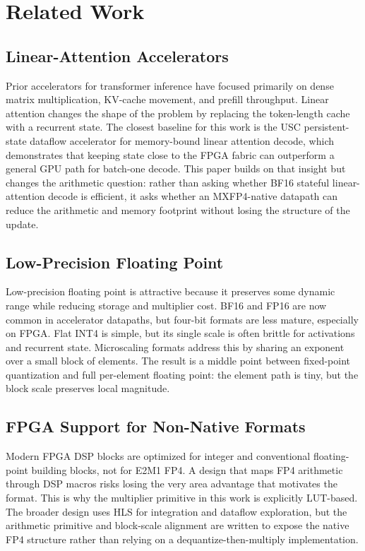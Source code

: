 \documentclass[conference]{IEEEtran}
\begin{document}
\section{Related Work}

\subsection{Linear-Attention Accelerators}

Prior accelerators for transformer inference have focused primarily on dense
matrix multiplication, KV-cache movement, and prefill throughput. Linear
attention changes the shape of the problem by replacing the token-length cache
with a recurrent state. The closest baseline for this work is the USC
persistent-state dataflow accelerator for memory-bound linear attention decode,
which demonstrates that keeping state close to the FPGA fabric can outperform a
general GPU path for batch-one decode. This paper builds on that insight but
changes the arithmetic question: rather than asking whether BF16 stateful
linear-attention decode is efficient, it asks whether an MXFP4-native datapath
can reduce the arithmetic and memory footprint without losing the structure of
the update.

\subsection{Low-Precision Floating Point}

Low-precision floating point is attractive because it preserves some dynamic
range while reducing storage and multiplier cost. BF16 and FP16 are now common
in accelerator datapaths, but four-bit formats are less mature, especially on
FPGA. Flat INT4 is simple, but its single scale is often brittle for activations
and recurrent state. Microscaling formats address this by sharing an exponent
over a small block of elements. The result is a middle point between fixed-point
quantization and full per-element floating point: the element path is tiny, but
the block scale preserves local magnitude.

\subsection{FPGA Support for Non-Native Formats}

Modern FPGA DSP blocks are optimized for integer and conventional floating-point
building blocks, not for E2M1 FP4. A design that maps FP4 arithmetic through DSP
macros risks losing the very area advantage that motivates the format. This is
why the multiplier primitive in this work is explicitly LUT-based. The broader
design uses HLS for integration and dataflow exploration, but the arithmetic
primitive and block-scale alignment are written to expose the native FP4
structure rather than relying on a dequantize-then-multiply implementation.
\end{document}

